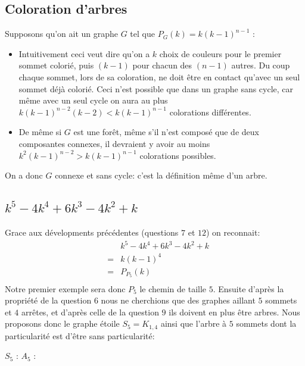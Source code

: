 \subsection{Coloration d'arbres}
Supposons qu'on ait un graphe $G$ tel que $P_G(k) = k(k-1)^{n-1}$ :
\begin {itemize}
\item Intuitivement ceci veut dire qu'on a $k$ choix de couleurs pour le premier sommet colorié, puis $(k-1)$ pour chacun des $(n-1)$ autres. Du coup chaque sommet, lors de sa coloration, ne doit être en contact qu'avec un seul sommet déjà colorié. Ceci n'est possible que dans un graphe sans cycle, car même avec un seul cycle on aura au plus $k(k-1)^{n-2}(k-2) < k(k-1)^{n-1}$ colorations différentes.
\item De même si $G$ est une forêt, même s'il n'est composé que de deux composantes connexes, il devraient y avoir au moins $k^2(k-1)^{n-2} > k(k-1)^{n-1}$ colorations possibles.
\end {itemize}
On a donc $G$ connexe et sans cycle: c'est la définition même d'un arbre.

\subsection{$k^5 - 4k^4 + 6k^3 - 4k^2 + k$}
Grace aux dévelopments précédentes (questions $7$ et $12$) on reconnait:
\begin{eqnarray*}
&&		k^5 - 4k^4 + 6k^3 - 4k^2 + k 	\\	
&=&		k(k-1)^4						\\
&=&		P_{P_5}(k)						\\
\end{eqnarray*}
Notre premier exemple sera donc $P_5$ le chemin de taille $5$. Ensuite d'après la propriété de la question $6$ nous ne cherchions que des graphes aillant $5$ sommets et $4$ arrêtes, et d'après celle de la question $9$ ils doivent en plus être arbres. Nous proposons donc le graphe étoile $S_5 = K_{1,4}$ ainsi que l'arbre à $5$ sommets dont la particularité est d'être sans particularité:

\begin{center}
$S_5$ :  \hspace{3cm}
$A_5$ : 
\end{center}

